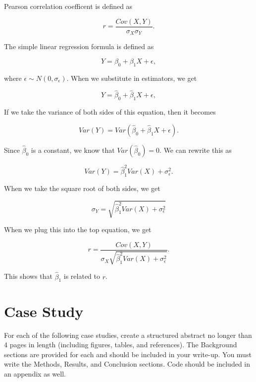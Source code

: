 \documentclass{article}
\begin{document}
\begin{enumerate}
		Pearson correlation coefficent is defined as

		$$r = \frac{Cov(X, Y)}{\sigma_X \sigma_Y}.$$

		The simple linear regression formula is defined as

		$$Y = \beta_0 + \beta_1X + \epsilon,$$

		where $\epsilon \sim N(0, \sigma_\epsilon) $. When we substitute in estimators, we get

		$$Y = \hat\beta_0 + \hat\beta_1X + \epsilon,$$
		
		If we take the variance of both sides of this equation, then it becomes

		$$Var(Y) = Var(\hat\beta_0 + \hat\beta_1X + \epsilon).$$

		Since $\hat\beta_0$ is a constant, we know that $Var(\hat\beta_0) = 0$. We can rewrite this as

		$$Var(Y) = \hat\beta_1^2Var(X) + \sigma_\epsilon^2.$$

		When we take the square root of both sides, we get

		$$\sigma_Y = \sqrt{\hat\beta_1^2Var(X) + \sigma_\epsilon^2} $$

		When we plug this into the top equation, we get

		$$r = \frac{Cov(X, Y)}{\sigma_X \sqrt{\hat\beta_1^2Var(X) + \sigma_\epsilon^2}}.$$

		This shows that $\hat\beta_1$ is related to $r$.

		




	\end{enumerate}



	\newpage
	\section*{Case Study}
	For each of the following case studies, create a structured abstract no longer than 4 pages in length (including figures, tables, and references). The Background sections are provided for each and should be included in your write-up. You must write the Methods, Results, and Conclusion sections. Code should be included in an appendix as well.
\end{document}
